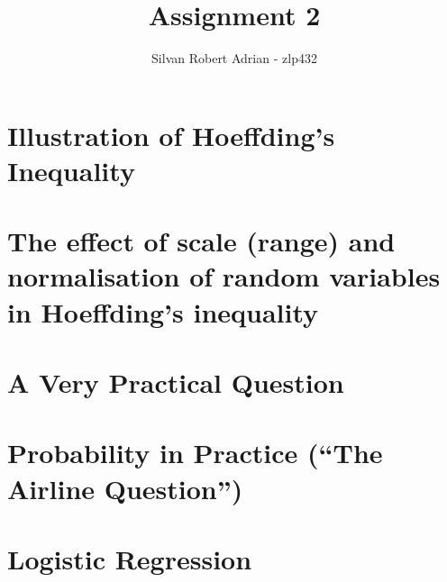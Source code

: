 \documentclass[a4paper]{article}
\title{\vspace{-5cm} Assignment 2}
\author{Silvan Robert Adrian - zlp432}
\newcommand{\1}{\mathbbm{1}}
\begin{document}
\maketitle

\tableofcontents

\section{Illustration of Hoeffding's Inequality}


\section{The effect of scale (range) and normalisation of random variables in
Hoeffding's inequality}


\section{A Very Practical Question}


\section{Probability in Practice (``The Airline Question'')}


\section{Logistic Regression}

\end{document}
